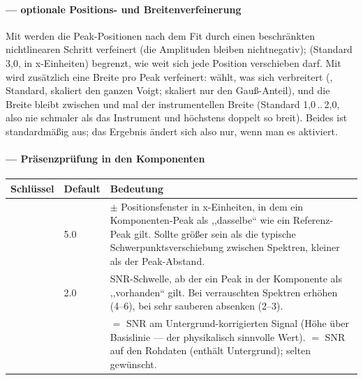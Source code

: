 \documentclass[11pt,a4paper]{article}
\begin{document}
\paragraph{\code{[refine]} --- optionale Positions- und Breitenverfeinerung}
Mit  werden die Peak-Positionen nach dem Fit durch einen
beschr\"ankten nichtlinearen Schritt verfeinert (die Amplituden bleiben
nichtnegativ);  (Standard 3{,}0, in x-Einheiten) begrenzt, wie
weit sich jede Position verschieben darf. Mit  wird
zus\"atzlich eine Breite pro Peak verfeinert:  w\"ahlt, was sich
verbreitert (, Standard, skaliert den ganzen Voigt; 
skaliert nur den Gau\ss-Anteil), und die Breite bleibt zwischen
 und  mal der instrumentellen Breite
(Standard 1{,}0\,..\,2{,}0, also nie schmaler als das Instrument und h\"ochstens
doppelt so breit). Beides ist standardm\"a\ss ig aus; das Ergebnis \"andert sich
also nur, wenn man es aktiviert.

\paragraph{\code{[presence]} --- Pr\"asenzpr\"ufung in den Komponenten}
\begin{table}[h]\small\centering
\begin{tabularx}{\linewidth}{@{}l l L@{}}
\toprule
\textbf{Schl\"ussel} & \textbf{Default} & \textbf{Bedeutung}\\
\midrule
{} & 5.0 & $\pm$ Positionsfenster in x-Einheiten, in dem ein Komponenten-Peak als ,,dasselbe`` wie ein Referenz-Peak gilt. Sollte gr\"o\ss er sein als die typische Schwerpunktsverschiebung zwischen Spektren, kleiner als der Peak-Abstand.\\
 & 2.0 & SNR-Schwelle, ab der ein Peak in der Komponente als ,,vorhanden`` gilt. Bei verrauschten Spektren erh\"ohen (4--6), bei sehr sauberen absenken (2--3).\\
 &  &  $=$ SNR am Untergrund-korrigierten Signal (H\"ohe \"uber Basislinie --- der physikalisch sinnvolle Wert).  $=$ SNR auf den Rohdaten (enth\"alt Untergrund); selten gew\"unscht.\\
\bottomrule
\end{tabularx}
\end{table}
\end{document}
